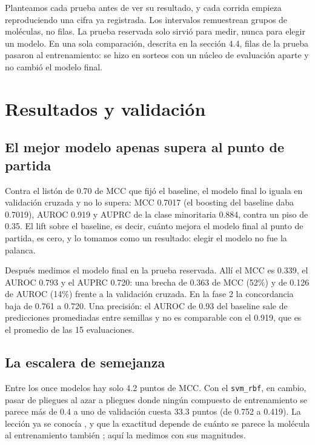 \documentclass[letterpaper,11pt]{article}
\begin{document}
Planteamos cada prueba antes de ver su resultado, y cada corrida empieza reproduciendo una cifra ya registrada. Los intervalos remuestrean grupos de moléculas, no filas. La prueba reservada solo sirvió para medir, nunca para elegir un modelo. En una sola comparación, descrita en la sección 4.4, filas de la prueba pasaron al entrenamiento: se hizo en sorteos con un núcleo de evaluación aparte y no cambió el modelo final.

\section{Resultados y validación}
\subsection{El mejor modelo apenas supera al punto de partida}

Contra el listón de 0.70 de MCC que fijó el baseline, el modelo final lo iguala en validación cruzada y no lo supera: MCC 0.7017 (el boosting del baseline daba 0.7019), AUROC 0.919 y AUPRC de la clase minoritaria 0.884, contra un piso de 0.35. El lift sobre el baseline, es decir, cuánto mejora el modelo final al punto de partida, es cero, y lo tomamos como un resultado: elegir el modelo no fue la palanca.

Después medimos el modelo final en la prueba reservada. Allí el MCC es 0.339, el AUROC 0.793 y el AUPRC 0.720: una brecha de 0.363 de MCC (52\%) y de 0.126 de AUROC (14\%) frente a la validación cruzada. En la fase 2 la concordancia baja de 0.761 a 0.720. Una precisión: el AUROC de 0.93 del baseline sale de predicciones promediadas entre semillas y no es comparable con el 0.919, que es el promedio de las 15 evaluaciones.

\subsection{La escalera de semejanza}

Entre los once modelos hay solo 4.2 puntos de MCC. Con el \texttt{svm\_rbf}, en cambio, pasar de pliegues al azar a pliegues donde ningún compuesto de entrenamiento se parece más de 0.4 a uno de validación cuesta 33.3 puntos (de 0.752 a 0.419). La lección ya se conocía \autocite{sheridan2013} \autocite{roberts2017crossvalidation}, y que la exactitud depende de cuánto se parece la molécula al entrenamiento también \autocite{sheridan2004similarity}; aquí la medimos con sus magnitudes.
\end{document}
